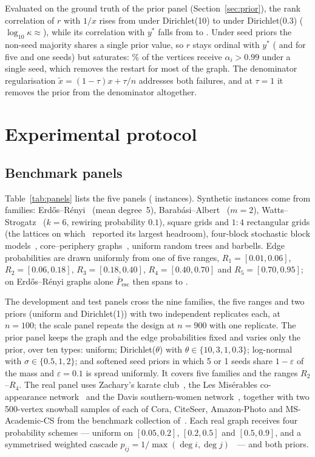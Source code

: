 \documentclass[11pt,a4paper]{article}
\theoremstyle{definition}
\theoremstyle{plain}
\newcommand{\Pescbar}{\bar{P}_{\mathrm{esc}}}
\begin{document}
Evaluated on the ground truth of the prior panel (Section~\ref{sec:prior}), the rank correlation of $r$ with $1/x$ rises from \RinvDirTen{} under Dirichlet(10) to \RinvDirSmall{} under Dirichlet(0.3) ($\log_{10}\kappa\approx{}$\KappaDirSmall{}), while its correlation with $y^*$ falls from \RyDirTen{} to \RyDirSmall. Under seed priors the non-seed majority shares a single prior value, so $r$ stays ordinal with $y^*$ (\RySeedFive{} and \RySeedOne{} for five and one seeds) but saturates: \SatSeedOne\% of the vertices receive $\alpha_i>0.99$ under a single seed, which removes the restart for most of the graph. The denominator regularisation $\tilde x=(1-\tau)x+\tau/n$ addresses both failures, and at $\tau=1$ it removes the prior from the denominator altogether.

\FloatBarrier
\section{Experimental protocol}\label{sec:protocol}

\subsection{Benchmark panels}\label{sec:panels}

Table~\ref{tab:panels} lists the five panels (\NTotal{} instances). Synthetic instances come from \NFamilies{} families: Erdős--Rényi~\cite{erdos59} (mean degree~5), Barabási--Albert~\cite{barabasi99} ($m=2$), Watts--Strogatz~\cite{watts98} ($k=6$, rewiring probability $0.1$), square grids and $1{:}4$ rectangular grids (the lattices on which~\cite{konstantellos26} reported its largest headroom), four-block stochastic block models~\cite{holland83}, core--periphery graphs~\cite{borgatti00}, uniform random trees and barbells. Edge probabilities are drawn uniformly from one of five ranges, $R_1=[0.01,0.06]$, $R_2=[0.06,0.18]$, $R_3=[0.18,0.40]$, $R_4=[0.40,0.70]$ and $R_5=[0.70,0.95]$; on Erdős--Rényi graphs alone $\Pescbar$ then spans \ERPbarMin{} to \ERPbarMax.

The development and test panels cross the nine families, the five ranges and two priors (uniform and Dirichlet(1)) with two independent replicates each, at $n=100$; the scale panel repeats the design at $n=900$ with one replicate. The prior panel keeps the graph and the edge probabilities fixed and varies only the prior, over ten types: uniform; Dirichlet($\theta$) with $\theta\in\{10,3,1,0.3\}$; log-normal with $\sigma\in\{0.5,1,2\}$; and softened seed priors in which 5 or 1 seeds share $1-\varepsilon$ of the mass and $\varepsilon=0.1$ is spread uniformly. It covers five families and the ranges $R_2$--$R_4$. The real panel uses Zachary's karate club~\cite{zachary77}, the Les Misérables co-appearance network~\cite{knuth93} and the Davis southern-women network~\cite{davis41}, together with two 500-vertex snowball samples of each of Cora, CiteSeer, Amazon-Photo and MS-Academic-CS from the benchmark collection of~\cite{shchur18}. Each real graph receives four probability schemes --- uniform on $[0.05,0.2]$, $[0.2,0.5]$ and $[0.5,0.9]$, and a symmetrised weighted cascade $p_{ij}=1/\max(\deg i,\deg j)$~\cite{kkt03} --- and both priors.
\end{document}
